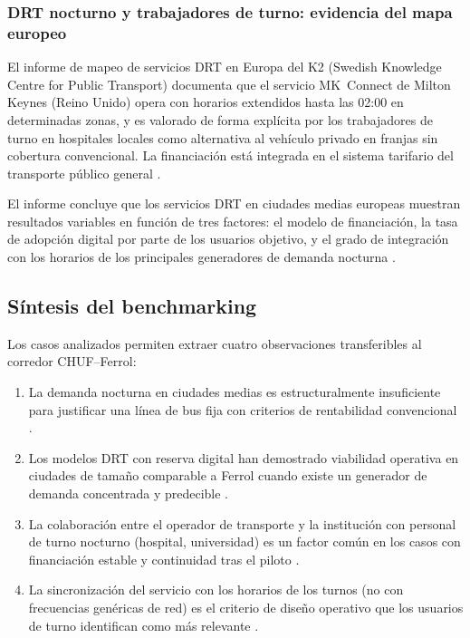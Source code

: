\subsubsection{DRT nocturno y trabajadores de turno: evidencia del mapa europeo}
\label{sec:drt-mapa-europeo}

El informe de mapeo de servicios DRT en Europa del
K2 (Swedish Knowledge Centre for Public Transport)
documenta que el servicio MK~Connect de Milton Keynes
(Reino Unido) opera con horarios extendidos hasta las
02:00 en determinadas zonas, y es valorado de forma
explícita por los trabajadores de turno en hospitales
locales como alternativa al vehículo privado en
franjas sin cobertura convencional. La financiación
está integrada en el sistema tarifario del transporte
público general \parencite{K2Centrum2025DRT}.

El informe concluye que los servicios DRT en ciudades
medias europeas muestran resultados variables en función
de tres factores: el modelo de financiación, la tasa
de adopción digital por parte de los usuarios objetivo,
y el grado de integración con los horarios de los
principales generadores de demanda nocturna
\parencite{K2Centrum2025DRT}.

\subsection{Síntesis del benchmarking}
\label{sec:sintesis-benchmarking}

Los casos analizados permiten extraer cuatro
observaciones transferibles al corredor CHUF--Ferrol:

\begin{enumerate}
  \item La demanda nocturna en ciudades medias es
    estructuralmente insuficiente para justificar
    una línea de bus fija con criterios de rentabilidad
    convencional \parencite{Estrada2021}.

  \item Los modelos DRT con reserva digital han
    demostrado viabilidad operativa en ciudades de
    tamaño comparable a Ferrol cuando existe un
    generador de demanda concentrada y predecible
    \parencite{Busitalia2019QuiBus, K2Centrum2025DRT}.

  \item La colaboración entre el operador de transporte
    y la institución con personal de turno nocturno
    (hospital, universidad) es un factor común en los
    casos con financiación estable y continuidad tras
    el piloto \parencite{Stagecoach2020Hull,
    Busitalia2019QuiBus}.

  \item La sincronización del servicio con los horarios
    de los turnos (no con frecuencias genéricas de
    red) es el criterio de diseño operativo que los
    usuarios de turno identifican como más relevante
    \parencite{K2Centrum2025DRT, Stagecoach2020Hull}.
\end{enumerate}

